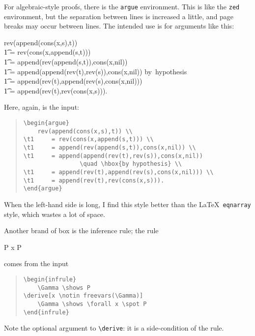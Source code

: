 For algebraic-style proofs, there is the \verb|argue| environment.
This is like the \verb|zed| environment, but the separation between
lines is increased a little, and page breaks may occur between lines.
The intended use is for arguments like this:
\begin{argue}
    rev(append(cons(x,s),t)) \\
\t1     = rev(cons(x,append(s,t))) \\
\t1     = append(rev(append(s,t)),cons(x,nil)) \\
\t1     = append(append(rev(t),rev(s)),cons(x,nil))
                \quad \hbox{by hypothesis} \\
\t1     = append(rev(t),append(rev(s),cons(x,nil))) \\
\t1     = append(rev(t),rev(cons(x,s))).
\end{argue}
Here, again, is the input:
\begin{quote}
\begin{verbatim}
\begin{argue}
    rev(append(cons(x,s),t)) \\
\t1     = rev(cons(x,append(s,t))) \\
\t1     = append(rev(append(s,t)),cons(x,nil)) \\
\t1     = append(append(rev(t),rev(s)),cons(x,nil))
                \quad \hbox{by hypothesis} \\
\t1     = append(rev(t),append(rev(s),cons(x,nil))) \\
\t1     = append(rev(t),rev(cons(x,s))).
\end{argue}
\end{verbatim}
\end{quote}
When the left-hand side is long, I find this style better than the
\LaTeX\ \verb|eqnarray| style, which wastes a lot of space.

Another brand of box is the inference rule; the rule
\begin{infrule}
    \Gamma \shows P
    \Gamma \shows \forall x \spot P
\end{infrule}
comes from the input
\begin{quote}
\begin{verbatim}
\begin{infrule}
    \Gamma \shows P
\derive[x \notin freevars(\Gamma)]
    \Gamma \shows \forall x \spot P
\end{infrule}
\end{verbatim}
\end{quote}
Note the optional argument to \verb|\derive|: it is a side-condition of
the rule.

